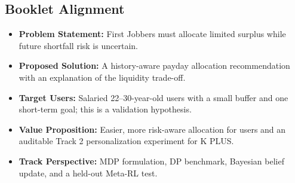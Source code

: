 \subsection{Booklet Alignment}
\begin{itemize}[noitemsep,topsep=1pt,leftmargin=*]
    \item \textbf{Problem Statement:} First Jobbers must allocate limited surplus while future shortfall risk is uncertain.
    \item \textbf{Proposed Solution:} A history-aware payday allocation recommendation with an explanation of the liquidity trade-off.
    \item \textbf{Target Users:} Salaried 22--30-year-old users with a small buffer and one short-term goal; this is a validation hypothesis.
    \item \textbf{Value Proposition:} Easier, more risk-aware allocation for users and an auditable Track 2 personalization experiment for K PLUS.
    \item \textbf{Track Perspective:} MDP formulation, DP benchmark, Bayesian belief update, and a held-out Meta-RL test.
\end{itemize}
